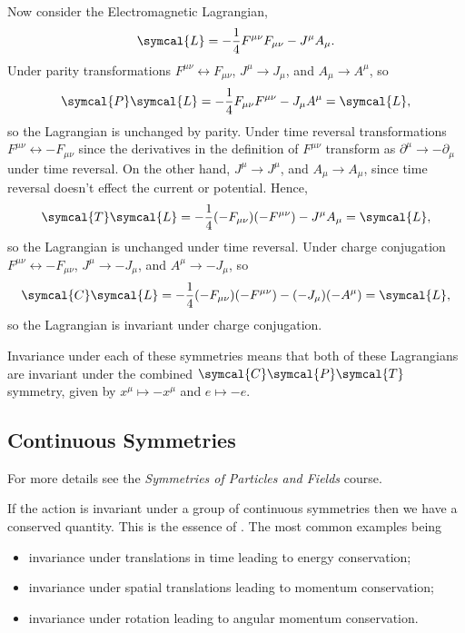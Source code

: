 \documentclass[fleqn]{NotesClass}
\newcommand*{\course}[1]{\textit{#1}}
\newcommand{\lagrangianDensity}{\symcal{L}}
\newcommand{\parity}{\symcal{P}}
\newcommand{\chargeConjugation}{\symcal{C}}
\newcommand{\timeReversal}{\symcal{T}}
\begin{document}
    Now consider the Electromagnetic Lagrangian,
    \begin{equation}
        \lagrangianDensity = -\frac{1}{4}F^{\mu\nu}F_{\mu\nu} - J^\mu A_\mu.
    \end{equation}
    Under parity transformations \(F^{\mu\nu} \leftrightarrow F_{\mu\nu}\), \(J^\mu \to J_\mu\), and \(A_\mu \to A^\mu\), so
    \begin{equation}
        \parity\lagrangianDensity = -\frac{1}{4}F_{\mu\nu}F^{\mu\nu} - J_\mu A^\mu = \lagrangianDensity,
    \end{equation}
    so the Lagrangian is unchanged by parity.
    Under time reversal transformations \(F^{\mu\nu} \leftrightarrow -F_{\mu\nu}\) since the derivatives in the definition of \(F^{\mu\nu}\) transform as \(\partial^\mu \to -\partial_\mu\) under time reversal.
    On the other hand, \(J^\mu \to J^\mu\), and \(A_\mu \to A_\mu\), since time reversal doesn't effect the current or potential.
    Hence,
    \begin{equation}
        \timeReversal\lagrangianDensity = -\frac{1}{4}(-F_{\mu\nu})(-F^{\mu\nu}) - J^\mu A_\mu = \lagrangianDensity,
    \end{equation}
    so the Lagrangian is unchanged under time reversal.
    Under charge conjugation \(F^{\mu\nu} \leftrightarrow -F_{\mu\nu}\), \(J^\mu \to -J_\mu\), and \(A^\mu \to -J_\mu\), so
    \begin{equation}
        \chargeConjugation\lagrangianDensity = -\frac{1}{4}(-F_{\mu\nu})(-F^{\mu\nu}) - (-J_\mu)(-A^\mu) = \lagrangianDensity,
    \end{equation}
    so the Lagrangian is invariant under charge conjugation.
    
    Invariance under each of these symmetries means that both of these Lagrangians are invariant under the combined \(\chargeConjugation\parity\timeReversal\) symmetry, given by \(x^\mu \mapsto -x^\mu\) and \(e \mapsto -e\).
    
    \subsection{Continuous Symmetries}
    \begin{rmk}
        For more details see the \course{Symmetries of Particles and Fields} course.
    \end{rmk}
    If the action is invariant under a group of continuous symmetries then we have a conserved quantity.
    This is the essence of .
    The most common examples being
    \begin{itemize}
        \item invariance under translations in time leading to energy conservation;
        \item invariance under spatial translations leading to momentum conservation;
        \item invariance under rotation leading to angular momentum conservation.
    \end{itemize}
    
\end{document}
